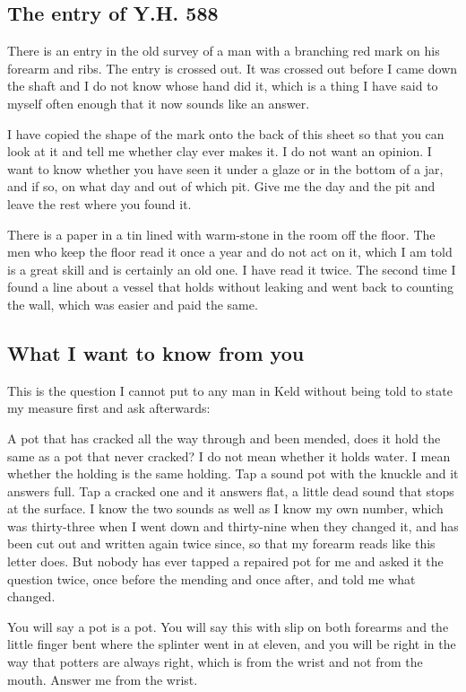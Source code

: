 \documentclass{design/chronicle}
\begin{document}
\subsection*{The entry of Y.H. 588}

There is an entry in the old survey of a man with a branching red mark on his forearm and ribs. The entry is crossed out. It was crossed out before I came down the shaft and I do not know whose hand did it, which is a thing I have said to myself often enough that it now sounds like an answer.

I have copied the shape of the mark onto the back of this sheet so that you can look at it and tell me whether clay ever makes it. I do not want an opinion. I want to know whether you have seen it under a glaze or in the bottom of a jar, and if so, on what day and out of which pit. Give me the day and the pit and leave the rest where you found it.

There is a paper in a tin lined with warm-stone in the room off the floor. The men who keep the floor read it once a year and do not act on it, which I am told is a great skill and is certainly an old one. I have read it twice. The second time I found a line about a vessel that holds without leaking and went back to counting the wall, which was easier and paid the same.

\subsection*{What I want to know from you}

This is the question I cannot put to any man in Keld without being told to state my measure first and ask afterwards:

A pot that has cracked all the way through and been mended, does it hold the same as a pot that never cracked? I do not mean whether it holds water. I mean whether the holding is the same holding. Tap a sound pot with the knuckle and it answers full. Tap a cracked one and it answers flat, a little dead sound that stops at the surface. I know the two sounds as well as I know my own number, which was thirty-three when I went down and thirty-nine when they changed it, and has been cut out and written again twice since, so that my forearm reads like this letter does. But nobody has ever tapped a repaired pot for me and asked it the question twice, once before the mending and once after, and told me what changed.

You will say a pot is a pot. You will say this with slip on both forearms and the little finger bent where the splinter went in at eleven, and you will be right in the way that potters are always right, which is from the wrist and not from the mouth. Answer me from the wrist.
\end{document}
